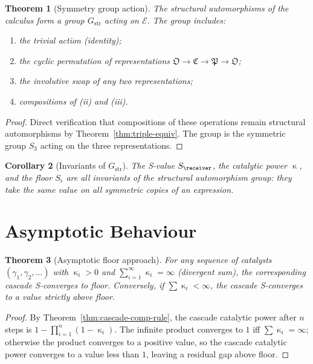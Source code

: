 \documentclass[11pt,a4paper]{article}
\theoremstyle{thmstyle}
\newtheorem{theorem}{Theorem}[section]
\newtheorem{corollary}[theorem]{Corollary}
\theoremstyle{thmstyle}
\theoremstyle{definition}
\theoremstyle{remark}
\DeclareMathOperator{\catpow}{\kappa}
\newcommand{\Osc}{\mathfrak{O}}
\newcommand{\Cat}{\mathfrak{C}}
\newcommand{\Part}{\mathfrak{P}}
\newcommand{\Expr}{\mathcal{E}}
\newcommand{\Cat}{\mathfrak{C}}
\newcommand{\Sscalar}{S}
\newcommand{\Sfloor}{S_{\flat}}
\begin{document}
\begin{theorem}[Symmetry group action]
\label{thm:sym-group}
The structural automorphisms of the calculus form
a group $G_{\mathrm{str}}$ acting on $\Expr$.  The
group includes:
\begin{enumerate}[nosep,label=(\roman*)]
\item the trivial action (identity);
\item the cyclic permutation of representations
      $\Osc \to \Cat \to \Part \to \Osc$;
\item the involutive swap of any two representations;
\item compositions of (ii) and (iii).
\end{enumerate}
\end{theorem}

\begin{proof}
Direct verification that compositions of these
operations remain structural automorphisms by
Theorem~\ref{thm:triple-equiv}.  The group is the
symmetric group $S_{3}$ acting on the three
representations.
\end{proof}

\begin{corollary}[Invariants of $G_{\mathrm{str}}$]
\label{cor:invariants}
The S-value $\Sscalar_{\receiver}$, the catalytic
power $\catpow$, and the floor $\Sfloor$ are all
invariants of the structural automorphism group:
they take the same value on all symmetric copies
of an expression.
\end{corollary}

\section{Asymptotic Behaviour}
\label{sec:asymptotic-behaviour}

\begin{theorem}[Asymptotic floor approach]
\label{thm:asymp-floor}
For any sequence of catalysts
$(\gamma_{1}, \gamma_{2}, \ldots)$ with
$\catpow_{i} > 0$ and
$\sum_{i=1}^{\infty} \catpow_{i} = \infty$
(divergent sum), the corresponding cascade
S-converges to floor.  Conversely, if
$\sum \catpow_{i} < \infty$, the cascade
S-converges to a value strictly above floor.
\end{theorem}

\begin{proof}
By Theorem~\ref{thm:cascade-comp-rule}, the
cascade catalytic power after $n$ steps is
$1 - \prod_{i=1}^{n} (1 - \catpow_{i})$.  The
infinite product converges to $1$ iff
$\sum \catpow_{i} = \infty$; otherwise the
product converges to a positive value, so the
cascade catalytic power converges to a value less
than $1$, leaving a residual gap above floor.
\end{proof}
\end{document}
